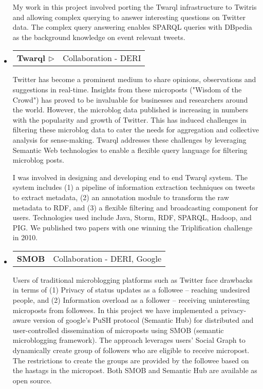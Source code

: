 \documentclass[letterpaper,9pt]{article}
\makeatletter
\newcommand{\resprojectheading}[2]{
\begin{tabular*}{7.0in}{l@{\extracolsep{\fill}}r}
		\textbf{#1} & #2\\
\end{tabular*}\vspace{-6pt}}
\makeatother
\begin{document}
\begin{itemize}
\justify
\hspace{1em} My work in this project involved porting the Twarql infrastructure to Twitris and allowing complex querying to answer interesting questions on Twitter data. The complex query answering enables SPARQL queries with DBpedia as the background knowledge on event relevant tweets. \\
\pagebreak
\item
\resprojectheading{Twarql \href{http://wiki.knoesis.org/index.php/Twarql}{$\triangleright$}}{Collaboration - DERI}
	\vspace{0.1in}
	
	\justify
\hspace{1em}  Twitter has become a prominent medium to share opinions, observations and suggestions in real-time. Insights from these microposts ("Wisdom of the Crowd") has proved to be invaluable for businesses and researchers around the world. However, the microblog data published is increasing in numbers with the popularity and growth of Twitter. This has induced challenges in filtering these microblog data to cater the needs for aggregation and collective analysis for sense-making. Twarql addresses these challenges by leveraging Semantic Web technologies to enable a flexible query language for filtering microblog posts.
    
    \justify
\hspace{1em}     I was involved in designing and developing end to end Twarql system. The system includes (1) a pipeline of information extraction techniques on tweets to extract metadata, (2) an annotation module to transform the  raw metadata to RDF, and (3) a flexible filtering and broadcasting component for users. Technologies used include Java, Storm, RDF, SPARQL, Hadoop, and PIG. We published two papers with one winning the Triplification challenge in 2010.  

\item
\resprojectheading{SMOB}{Collaboration - DERI, Google}
	\vspace{0.1in}

\justify
\hspace{1em} Users of traditional microblogging platforms such as Twitter face drawbacks in terms of (1) Privacy of status updates as a followee -- reaching undesired people, and (2) Information overload as a follower -- receiving uninteresting microposts from followees. In this project we have implemented a privacy-aware version of google's PuSH protocol (Semantic Hub) for distributed and user-controlled dissemination of microposts using SMOB (semantic microblogging framework). The approach leverages users' Social Graph to dynamically create group of followers who are eligible to receive micropost. The restrictions to create the groups are provided by the followee based on the hastags in the micropost. Both SMOB and Semantic Hub are available as open source.

     
\end{itemize}
\end{document}
